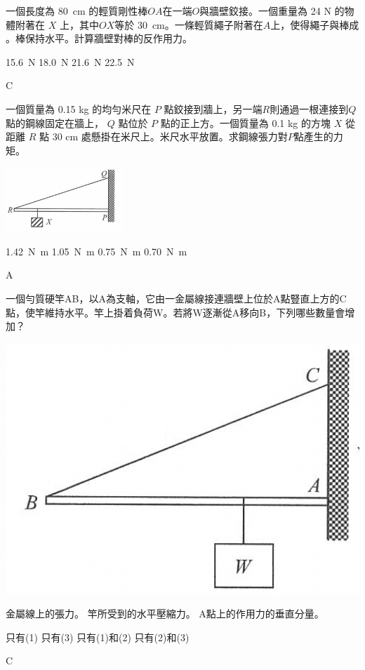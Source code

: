 {
     \bigskip\par
    一個長度為 \qty{80}{cm} 的輕質剛性棒$OA$在一端$O$與牆壁鉸接。一個重量為 24 N 的物體附著在 $X$ 上，其中$OX$等於 \qty{30}{cm}。一條輕質繩子附著在$A$上，使得繩子與棒成 。棒保持水平。計算牆壁對棒的反作用力。
    \begin{tasks}
        \task \qty{15.6}{N}
        \task \qty{18.0}{N}
        \task \qty{21.6}{N}
        \task \qty{22.5}{N}
    \end{tasks}

}{C}

{
    一個質量為 0.15 kg 的均勻米尺在 $P$ 點鉸接到牆上，另一端$R$則通過一根連接到$Q$點的鋼線固定在牆上， $Q$ 點位於 $P$ 點的正上方。一個質量為 0.1 kg 的方塊 $X$ 從距離 $R$ 點 30 cm 處懸掛在米尺上。米尺水平放置。求鋼線張力對$P$點產生的力矩。 \bigskip
    {\par\centering
        \includegraphics[width=0.33\textwidth]{assets/84e42251.png}
        \par} \bigskip
    \begin{tasks}
        \task \qty{1.42}{N.m}
        \task \qty{1.05}{N.m}
        \task \qty{0.75}{N.m}
        \task \qty{0.70}{N.m}
    \end{tasks}
}{A}

{
一個勻質硬竿AB，以A為支軸，它由一金屬線接連牆壁上位於A點豎直上方的C點，使竿維持水平。竿上掛着負荷W。若將W逐漸從A移向B，下列哪些數量會增加？
{\par\centering
\includegraphics[width=.3\textwidth]{assets/a9b14a8d.png}
\par}
\begin{statements}
    \task 金屬線上的張力。
    \task 竿所受到的水平壓縮力。
    \task A點上的作用力的垂直分量。
\end{statements}
\begin{tasks}
    \task 只有(1)
    \task 只有(3)
    \task 只有(1)和(2)
    \task 只有(2)和(3)
\end{tasks}
}{C}

